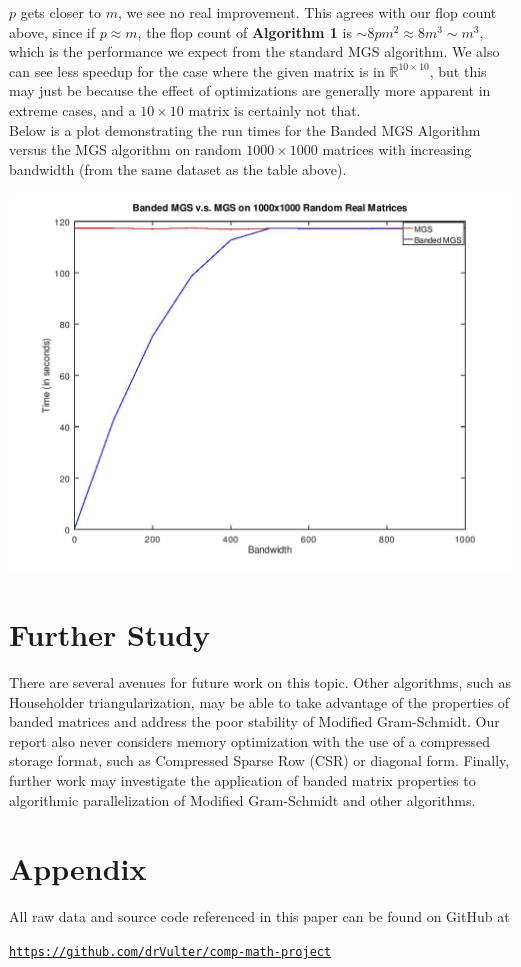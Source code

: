 \documentclass{article}
\numberwithin{pic}{section}
\numberwithin{lem}{section}
\numberwithin{thm}{section}
\numberwithin{cor}{section}
\theoremstyle{definition}
\numberwithin{ex}{section}
\numberwithin{defn}{section}
\theoremstyle{definition}
\theoremstyle{remark}
\newcommand{\R}{\ensuremath{\mathbb{R}}} %
\newlength\tindent
\renewcommand{\indent}{\hspace*{\tindent}}
\begin{document}
$p$ gets closer to $m$, we see no real improvement. This agrees with our flop
count above, since if $p\approx m$, the flop count of \textbf{Algorithm 1} is
$\sim 8pm^2\approx 8m^3\sim m^3$, which is the performance we expect from the standard
MGS algorithm. We also can see less speedup for the case where the given matrix
is in $\R^{10\times 10}$, but this may just be because the effect of optimizations are
generally more apparent in extreme cases, and a $10\times 10$ matrix is
certainly not that.\\
\indent Below is a plot demonstrating the run times for the Banded
MGS Algorithm versus the MGS algorithm on random $1000\times 1000$ matrices with
increasing bandwidth (from the same dataset as the table above).
\begin{center}
  \includegraphics[scale=0.4]{pi-data.jpg}
\end{center}
\section{Further Study}
\indent There are several avenues for future work on this topic. Other
algorithms, such as Householder triangularization, may be able to take advantage
of the properties of banded matrices and address the poor stability of Modified
Gram-Schmidt. Our report also never considers memory optimization with the use
of a compressed storage format, such as Compressed Sparse Row (CSR) or diagonal
form. Finally, further work may investigate the application of banded matrix
properties to algorithmic parallelization of Modified Gram-Schmidt and other
algorithms.
\appendix
{}
\section*{Appendix}
All raw data and source code referenced in this paper can be found on
GitHub at
\begin{center}
  \href{https://github.com/drVulter/comp-math-project}{\texttt{https://github.com/drVulter/comp-math-project}}
\end{center}
	

\end{document}
